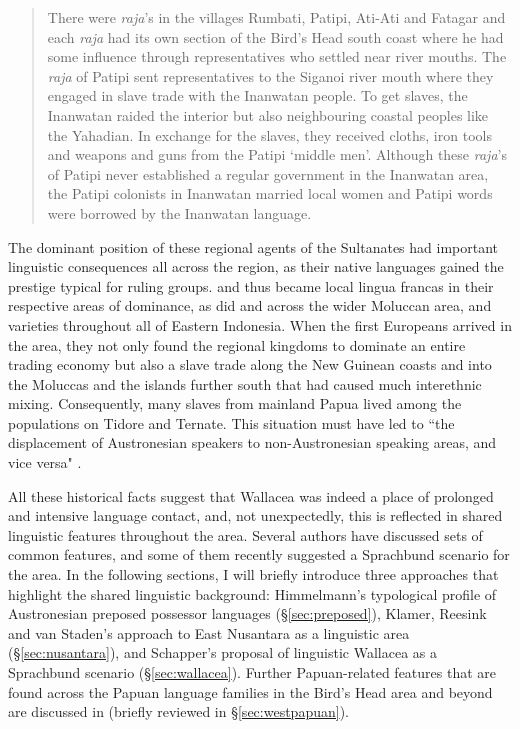 \begin{quote}There were \textit{raja}'s in the villages Rumbati, Patipi, Ati-Ati and Fatagar and each \textit{raja} had its own section of the Bird's Head south coast where he had some influence through representatives who settled near river mouths. The \textit{raja} of Patipi sent representatives to the Siganoi river mouth where they engaged in slave trade with the Inanwatan people. To get slaves, the Inanwatan raided the interior but also neighbouring coastal peoples like the Yahadian. In exchange for the slaves, they received cloths, iron tools and weapons and guns from the Patipi `middle men'. Although these \textit{raja}'s of Patipi never established a regular government in the Inanwatan area, the Patipi colonists in Inanwatan married local women and Patipi words were borrowed by the Inanwatan language.\end{quote}

The dominant position of these regional agents of the Sultanates had important linguistic consequences all across the region, as their native languages gained the prestige typical for ruling groups.  and  thus became local lingua francas in their respective areas of dominance, as did  and  across the wider Moluccan area, and  varieties throughout all of Eastern Indonesia. When the first Europeans arrived in the area, they not only found the regional kingdoms to dominate an entire trading economy but also a slave trade along the New Guinean coasts and into the Moluccas and the islands further south that had caused much interethnic mixing. Consequently, many slaves from mainland Papua lived among the populations on Tidore and Ternate. This situation must have led to ``the displacement of Austronesian speakers to non-Austronesian speaking areas, and vice versa" \citep[105f.]{klamer2008east}.

All these historical facts suggest that Wallacea was indeed a place of prolonged and intensive language contact, and, not unexpectedly, this is reflected in shared linguistic features throughout the area. Several authors have discussed sets of common features, and some of them recently suggested a Sprachbund scenario for the area. In the following sections, I will briefly introduce three approaches that highlight the shared linguistic background: Himmelmann's typological profile of Austronesian preposed possessor languages (§\ref{sec:preposed}), Klamer, Reesink and van Staden's approach to East Nusantara as a linguistic area (§\ref{sec:nusantara}), and Schapper's proposal of linguistic Wallacea as a Sprachbund scenario (§\ref{sec:wallacea}). Further Papuan-related features that are found across the Papuan language families in the Bird's Head area and beyond are discussed in \citet{reesink2005west} (briefly reviewed in §\ref{sec:westpapuan}).

